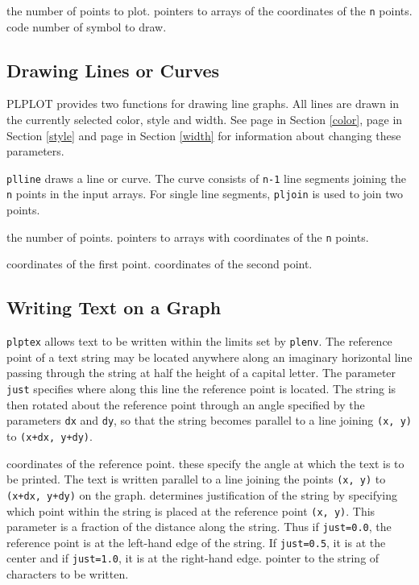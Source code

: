 {the number of points to plot.}
{pointers to arrays of the coordinates of the {\tt n} points.}
{code number of symbol to draw.}

\subsection {Drawing Lines or Curves}

PLPLOT provides two functions for drawing line graphs.
All lines are drawn in
the currently selected color, style and width. See page \pageref{color} in
Section \ref{color}, page \pageref{style} in Section \ref{style} and
page \pageref{width} in Section \ref{width} for
information about changing these parameters.

{\tt plline} draws a line or curve. The curve consists of {\tt n-1} line
segments joining the {\tt n} points in the input arrays. For single line
segments, {\tt pljoin} is used to join two points.

{the number of points.}
{pointers to arrays with coordinates of the {\tt n} points.}

{coordinates of the first point.}
{coordinates of the second point.}

\subsection {Writing Text on a Graph} \label {graph-text}

{\tt plptex} allows text to be written within the limits set by
{\tt plenv}. The reference point of a text string may be located
anywhere along an imaginary horizontal line passing through the string
at half the height of a capital letter. The parameter {\tt just} specifies
where along this line the reference point is located. The string is then
rotated about the reference point through an angle specified by the
parameters {\tt dx} and {\tt dy}, so that the string becomes parallel
to a line joining {\tt (x, y)} to {\tt (x+dx, y+dy)}.

{coordinates of the reference point.}
{these specify the angle at which the text is to be printed. The text is
 written parallel to a line joining the points {\tt (x, y)} to
 {\tt (x+dx, y+dy)} on the graph.}
{determines justification of the string by specifying which point within
 the string is placed at the reference point {\tt (x, y)}. This parameter
 is a fraction of the distance along the string. Thus if {\tt just=0.0}, 
 the reference point is at the left-hand edge of the string.
 If {\tt just=0.5}, it is at the center and if {\tt just=1.0}, it is at
 the right-hand edge.}
{pointer to the string of characters to be written.}

